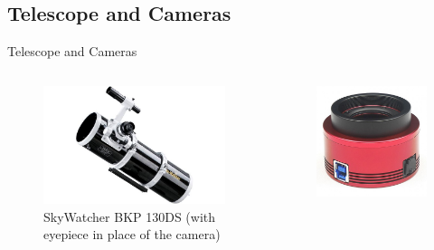 \documentclass[11pt, aspectratio=169]{beamer}
\begin{document}
\subsection{Telescope and Cameras}
\begin{frame}[c]{Telescope and Cameras}
    \begin{columns}
    \begin{column}{0.3\textwidth}
        \begin{figure}[c]
            \centering
            \includegraphics[width=\linewidth]{figures/images/SkyWatcher_BKP130DS.jpg}
            \caption*{SkyWatcher BKP 130DS (with eyepiece in place of the camera)}
        \end{figure}
    \end{column}
    \begin{column}{0.3\textwidth}
        \begin{figure}[c]
            \centering
            \includegraphics[width=\linewidth]{figures/images/ZWO_ASI183MM.jpg}

\end{figure}
\end{column}
\end{columns}
\end{frame}
\end{document}
